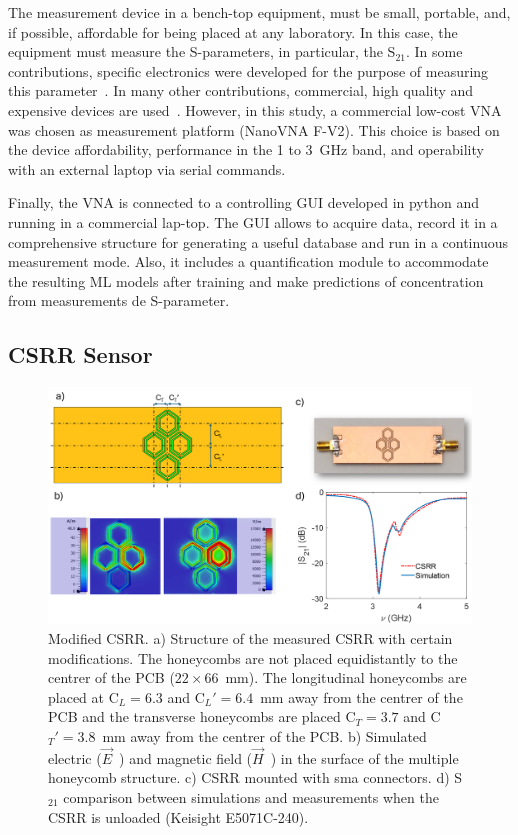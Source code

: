 \documentclass[journal,twoside,web]{ieeecolor}
\begin{document}
The measurement device in a bench-top equipment, must be small, portable, and, if possible, affordable for being placed at any laboratory. In this case, the equipment must measure the S-parameters, in particular, the S$_{21}$. In some contributions, specific electronics were developed for the purpose of measuring this parameter~\cite{Omer2020, Omer2021}. In many other contributions, commercial, high quality and expensive devices are used~\cite{Patel2022, Jiang2023, Liu2024}. However, in this study, a commercial low-cost VNA was chosen as measurement platform (NanoVNA F-V2). This choice is based on the device  affordability, performance in the 1 to 3~GHz band, and operability with an external laptop via serial commands.

Finally, the VNA is connected to a controlling GUI developed in python and running in a commercial lap-top. The GUI allows to acquire data, record it in a comprehensive structure for generating a useful database and run in a continuous measurement mode. Also, it includes a quantification module to accommodate the resulting ML models after training and make predictions of concentration from measurements de S-parameter.   
\subsection{CSRR Sensor}
\label{ssec:csrrSensor}

\begin{figure}[!t]
	\centering
	\includegraphics [trim = 0mm 0mm 0mm 0mm, clip, width=1\columnwidth]{figures/fig2.png}
	\caption{Modified CSRR. a) Structure of the measured CSRR with certain modifications. The honeycombs are not placed equidistantly to the centrer of the PCB ($22\times66$~mm). The longitudinal honeycombs are placed at C$_{L}=6.3$ and C$_{L}'=6.4$~mm away from the centrer of the PCB and the transverse honeycombs are placed C$_{T}=3.7$ and C$_{T}'=3.8$~mm away from the centrer of the PCB. b) Simulated electric ($\vec{E}$~) and magnetic field ($\vec{H}$~) in the surface of the multiple honeycomb structure. c) CSRR mounted with sma connectors. d) S$_{21}$ comparison between simulations and measurements when the CSRR is unloaded (Keisight E5071C-240).}
	\label{fig:csrr}
	\vspace{-0.3cm}
\end{figure}
\end{document}
